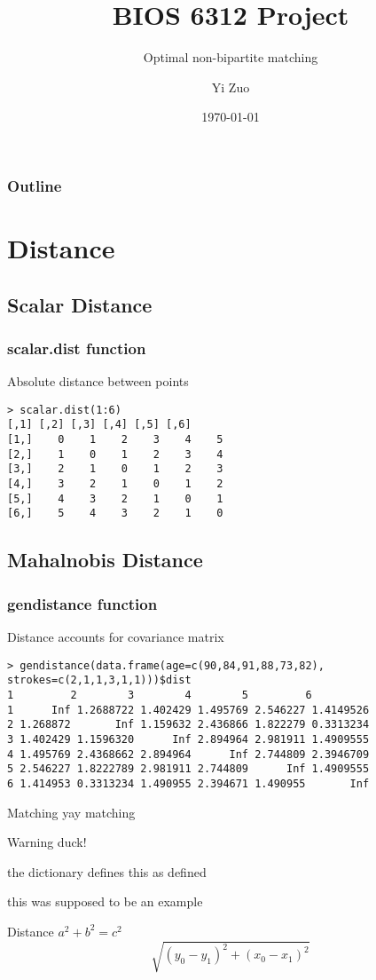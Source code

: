 \documentclass{beamer}
\title{BIOS 6312 Project}
\subtitle{Optimal non-bipartite matching}
\author{Yi Zuo}
\institute{Vanderbilt University}
\date{\today}
\begin{document}
\begin{frame}
\titlepage
\end{frame}


\begin{frame}
\frametitle{Outline}
\tableofcontents
\end{frame}

\section{Distance}
\subsection{Scalar Distance}
\begin{frame}[fragile=singleslide]
\frametitle{scalar.dist function}
Absolute distance between points
\begin{verbatim}
> scalar.dist(1:6)
[,1] [,2] [,3] [,4] [,5] [,6]
[1,]    0    1    2    3    4    5
[2,]    1    0    1    2    3    4
[3,]    2    1    0    1    2    3
[4,]    3    2    1    0    1    2
[5,]    4    3    2    1    0    1
[6,]    5    4    3    2    1    0
\end{verbatim}
\end{frame}

\subsection{Mahalnobis Distance}
\begin{frame}[fragile=singleslide]
\frametitle{gendistance function}
Distance accounts for covariance matrix
\begin{verbatim}
> gendistance(data.frame(age=c(90,84,91,88,73,82), strokes=c(2,1,1,3,1,1)))$dist
1         2        3        4        5         6
1      Inf 1.2688722 1.402429 1.495769 2.546227 1.4149526
2 1.268872       Inf 1.159632 2.436866 1.822279 0.3313234
3 1.402429 1.1596320      Inf 2.894964 2.981911 1.4909555
4 1.495769 2.4368662 2.894964      Inf 2.744809 2.3946709
5 2.546227 1.8222789 2.981911 2.744809      Inf 1.4909555
6 1.414953 0.3313234 1.490955 2.394671 1.490955       Inf
\end{verbatim}
\end{frame}

\begin{frame}
\begin{block}{Matching}
yay matching
\end{block}

\begin{alertblock}{Warning}
duck!
\end{alertblock}

\begin{definition}
the dictionary defines this as defined
\end{definition}

\begin{example}
this was supposed to be an example
\end{example}

\begin{theorem}{Distance}
$a^2 + b^2 = c^2$
\[
\sqrt{(y_0-y_1)^2 + (x_0-x_1)^2}
\]
\end{theorem}
\end{frame}
\end{document}
